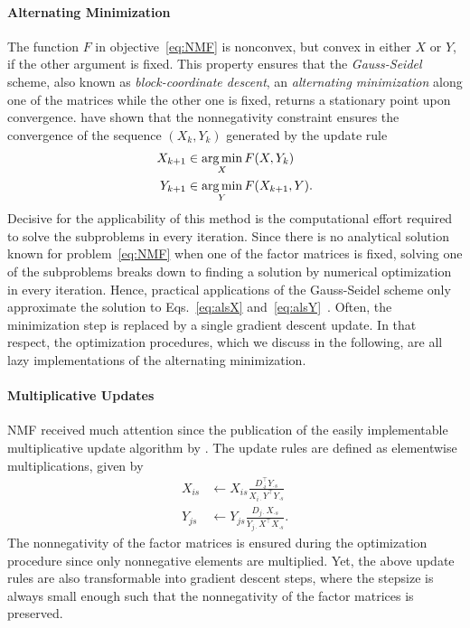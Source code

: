 \paragraph{Alternating Minimization}
The function $F$ in objective~\eqref{eq:NMF} is nonconvex, but convex in either $X$ or $Y$, if the other argument is fixed. This property ensures that the \emph{Gauss-Seidel} scheme, also known as \emph{block-coordinate descent}, an \emph{alternating minimization} along one of the matrices while the other one is fixed, returns a stationary point upon convergence. \cite{grippo2000convergence} have shown that the nonnegativity constraint ensures the convergence of the sequence $(X_k,Y_k)$ generated by the update rule
\begin{align}
X_{k+1} &\in \operatorname*{arg\,min}_{X} F(X,Y_k)\label{eq:alsX}\\
Y_{k+1} &\in \operatorname*{arg\,min}_{Y} F(X_{k+1},Y).\label{eq:alsY}
\end{align}
Decisive for the applicability of this method is the computational effort required to solve the subproblems in every iteration. Since there is no analytical solution known for problem~\eqref{eq:NMF} when one of the factor matrices is fixed, solving one of the subproblems breaks down to finding a solution by numerical optimization in every iteration.  Hence, practical applications of the Gauss-Seidel scheme only approximate the solution to Eqs.~\eqref{eq:alsX} and~\eqref{eq:alsY}~\citep{wang2013nonnegative}. Often, the minimization step is replaced by a single gradient descent update. In that respect, the optimization procedures, which we discuss in the following, are all lazy implementations of the alternating minimization.
%
\paragraph{Multiplicative Updates}
NMF received much attention since the publication of the easily implementable multiplicative update algorithm by \cite{lee2001algorithms}. The update rules are defined as elementwise multiplications, given by
\begin{align}
X_{is} &\leftarrow X_{is} \frac{D_{\cdot i}^\top Y_{\cdot s}}{X_{i\cdot}Y^\top Y_{\cdot s}}\label{eq:multUpdateX}\\
Y_{js} &\leftarrow Y_{js}\frac{D_{j\cdot}X_{\cdot s}}{Y_{j\cdot}X^\top X_{\cdot s}}. \label{eq:multUpdateY} 
\end{align}
The nonnegativity of the factor matrices is ensured during the optimization procedure since only nonnegative elements are multiplied. Yet, the above update rules are also transformable into gradient descent steps, where the stepsize is always small enough such that the nonnegativity of the factor matrices is preserved.


